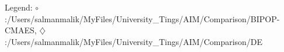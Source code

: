 Legend: {\color{NavyBlue}$\circ$}:/Users/salmanmalik/MyFiles/University\_Tings/AIM/Comparison/BIPOP-CMAES, {\color{Magenta}$\diamondsuit$}:/Users/salmanmalik/MyFiles/University\_Tings/AIM/Comparison/DE